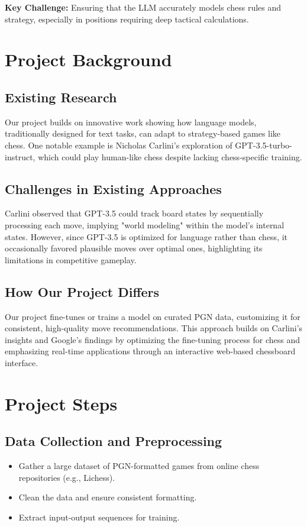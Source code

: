 \documentclass[11pt]{article}
\begin{document}
\textbf{Key Challenge:} Ensuring that the LLM accurately models chess rules and strategy, especially in positions requiring deep tactical calculations.

\section{Project Background}
\subsection{Existing Research}
Our project builds on innovative work showing how language models, traditionally designed for text tasks, can adapt to strategy-based games like chess. One notable example is Nicholas Carlini's exploration of GPT-3.5-turbo-instruct, which could play human-like chess despite lacking chess-specific training.

\subsection{Challenges in Existing Approaches}
Carlini observed that GPT-3.5 could track board states by sequentially processing each move, implying "world modeling" within the model’s internal states. However, since GPT-3.5 is optimized for language rather than chess, it occasionally favored plausible moves over optimal ones, highlighting its limitations in competitive gameplay.

\subsection{How Our Project Differs}
Our project fine-tunes or trains a model on curated PGN data, customizing it for consistent, high-quality move recommendations. This approach builds on Carlini’s insights and Google’s findings by optimizing the fine-tuning process for chess and emphasizing real-time applications through an interactive web-based chessboard interface.

\section{Project Steps}
\subsection{Data Collection and Preprocessing}
\begin{itemize}
    \item Gather a large dataset of PGN-formatted games from online chess repositories (e.g., Lichess).
    \item Clean the data and ensure consistent formatting.
    \item Extract input-output sequences for training.
\end{itemize}
\end{document}
